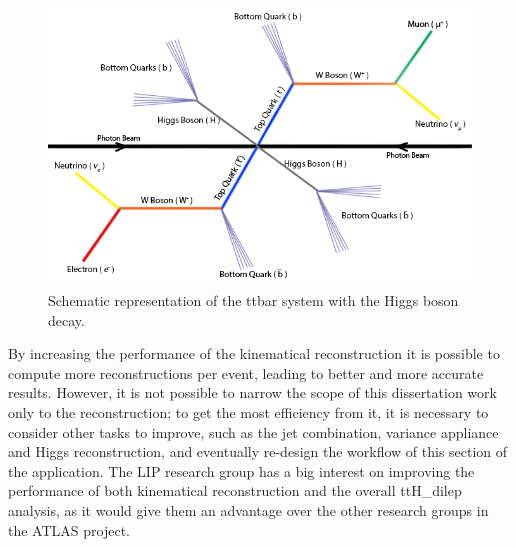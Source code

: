 \begin{figure}[!htp]
	\begin{center}
		\includegraphics[scale=0.5]{../../common/img/ttbar_higgs.png}
		\caption{Schematic representation of the ttbar system with the Higgs boson decay.}
		\label{fig:ttbarhiggs}
	\end{center}
\end{figure}

By increasing the performance of the kinematical reconstruction it is possible to compute more reconstructions per event, leading to better and more accurate results. However, it is not possible to narrow the scope of this dissertation work only to the reconstruction; to get the most efficiency from it, it is necessary to consider other tasks to improve, such as the jet combination, variance appliance and Higgs reconstruction, and eventually re-design the workflow of this section of the application. The LIP research group has a big interest on improving the performance of both kinematical reconstruction and the overall ttH\_dilep analysis, as it would give them an advantage over the other research groups in the ATLAS project.

\newpage
